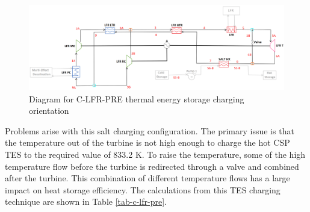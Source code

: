 \begin{figure}[H]
    \widefigure
    \includegraphics[width=\linewidth]{Definitions/c-lfr-pre.pdf}
    \caption{Diagram for C-LFR-PRE thermal energy storage charging orientation\label{c-lfr-pre}}
\end{figure}
\begin{paracol}{2}
\linenumbers
\switchcolumn

Problems arise with this salt charging configuration. The primary issue is that the temperature out of the turbine is not high enough to charge the hot CSP TES to the required value of 833.2 K. To raise the temperature, some of the high temperature flow before the turbine is redirected through a valve and combined after the turbine. This combination of different temperature flows has a large impact on heat storage efficiency. The calculations from this TES charging technique are shown in Table \ref{tab-c-lfr-pre}.


\end{paracol}
